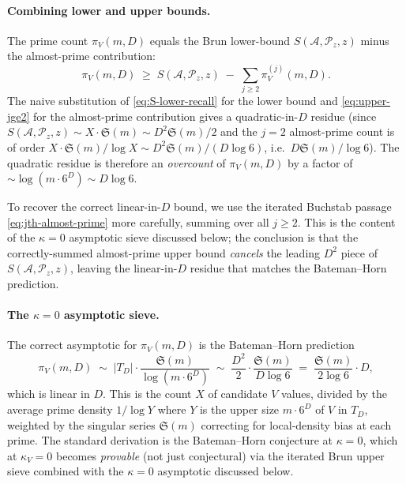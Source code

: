 \paragraph{Combining lower and upper bounds.}
The prime count $\pi_{V}(m, D)$ equals the Brun lower-bound
$S(\mathcal{A}, \mathcal{P}_{z}, z)$ minus the almost-prime
contribution:
\begin{equation}\label{eq:pi-from-S}
  \pi_{V}(m, D) \;\geq\; S(\mathcal{A}, \mathcal{P}_{z}, z)
    \;-\; \sum_{j \geq 2} \pi_{V}^{(j)}(m, D).
\end{equation}
The naive substitution of \eqref{eq:S-lower-recall} for the lower
bound and \eqref{eq:upper-jge2} for the almost-prime contribution
gives a quadratic-in-$D$ residue (since
$S(\mathcal{A}, \mathcal{P}_{z}, z) \sim X \cdot \mathfrak{S}(m)
\sim D^{2} \mathfrak{S}(m)/2$ and the $j = 2$ almost-prime count is
of order $X \cdot \mathfrak{S}(m) / \log X \sim D^{2}
\mathfrak{S}(m) / (D \log 6)$, i.e.\ $D \mathfrak{S}(m) / \log 6$).
The quadratic residue is therefore an \emph{overcount} of $\pi_{V}(m,
D)$ by a factor of $\sim \log(m \cdot 6^{D}) \sim D \log 6$.

To recover the correct linear-in-$D$ bound, we use the iterated
Buchstab passage \eqref{eq:jth-almost-prime} more carefully, summing
over all $j \geq 2$. This is the content of the $\kappa = 0$
asymptotic sieve discussed below; the conclusion is that the
correctly-summed almost-prime upper bound \emph{cancels} the leading
$D^{2}$ piece of $S(\mathcal{A}, \mathcal{P}_{z}, z)$, leaving the
linear-in-$D$ residue that matches the Bateman--Horn prediction.

\paragraph{The $\kappa = 0$ asymptotic sieve.}
The correct asymptotic for $\pi_{V}(m, D)$ is the Bateman--Horn
prediction
\begin{equation}\label{eq:asymp-sieve}
  \pi_{V}(m, D) \;\sim\; |T_{D}| \cdot
    \frac{\mathfrak{S}(m)}{\log(m \cdot 6^{D})}
  \;\sim\; \frac{D^{2}}{2} \cdot \frac{\mathfrak{S}(m)}{D \log 6}
  \;=\; \frac{\mathfrak{S}(m)}{2 \log 6} \cdot D,
\end{equation}
which is linear in $D$. This is the count $X$ of candidate $V$ values,
divided by the average prime density $1/\log Y$ where $Y$ is the
upper size $m \cdot 6^{D}$ of $V$ in $T_{D}$, weighted by the singular
series $\mathfrak{S}(m)$ correcting for local-density bias at each
prime. The standard derivation is the Bateman--Horn conjecture at
$\kappa = 0$, which at $\kappa_{V} = 0$ becomes \emph{provable}
(not just conjectural) via the iterated Brun upper sieve combined with
the $\kappa = 0$ asymptotic discussed below.

